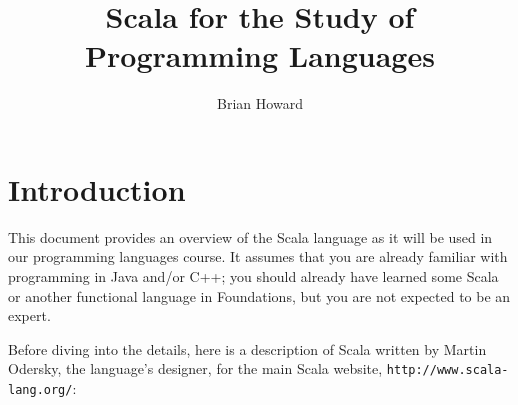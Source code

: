 \documentclass[11pt]{article}
\title{Scala for the Study of Programming Languages}
\author{Brian Howard}
\begin{document}
\maketitle
\section{Introduction}
This document provides an overview of the Scala language as it will
be used in our programming languages course. It assumes that you
are already familiar with programming in Java and/or C++; you should
already have learned some Scala or another functional language in
Foundations, but you are not expected to be an expert.

Before diving into the details, here is a description of Scala
written by Martin Odersky, the language's designer, for the main
Scala website, \texttt{http://www.scala-lang.org/}:
\end{document}
